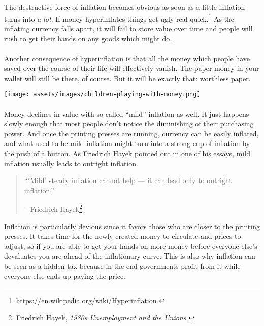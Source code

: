 The destructive force of inflation becomes obvious as soon as a little inflation
turns into \textit{a lot}. If money hyperinflates things get ugly real
quick.\footnote{\url{https://en.wikipedia.org/wiki/Hyperinflation}
\cite{wiki:hyperinflation}} As the inflating currency falls apart, it will fail
to store value over time and people will rush to get their hands on any goods
which might do.

\paragraph{}
Another consequence of hyperinflation is that all the money which people
have saved over the course of their life will effectively vanish. The
paper money in your wallet will still be there, of course. But it will
be exactly that: worthless paper.

\begin{center}
  \texttt{[image: assets/images/children-playing-with-money.png]}
  \label{fig:children-playing-with-money}
\end{center}

\paragraph{}
Money declines in value with so-called \enquote{mild} inflation as well. It
just happens slowly enough that most people don't notice the diminishing
of their purchasing power. And once the printing presses are running,
currency can be easily inflated, and what used to be mild inflation
might turn into a strong cup of inflation by the push of a button. As
Friedrich Hayek pointed out in one of his essays, mild inflation usually
leads to outright inflation.

\begin{quotation}\begin{samepage}
\enquote{`Mild' steady inflation cannot help --- it can lead only to outright
inflation.}
\begin{flushright} -- Friedrich Hayek\footnote{Friedrich Hayek, \textit{1980s
Unemployment and the Unions} \cite{hayek-inflation}}
\end{flushright}\end{samepage}\end{quotation}

Inflation is particularly devious since it favors those who are closer
to the printing presses. It takes time for the newly created money to
circulate and prices to adjust, so if you are able to get your hands on
more money before everyone else's devaluates you are ahead of the
inflationary curve. This is also why inflation can be seen as a hidden
tax because in the end governments profit from it while everyone else
ends up paying the price.

